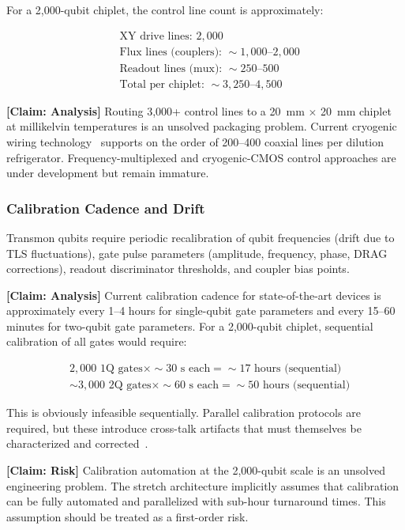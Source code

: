 \documentclass[conference]{IEEEtran}
\begin{document}
For a 2,000-qubit chiplet, the control line count is approximately:

\begin{align}
&\text{XY drive lines: } 2{,}000 \nonumber \\
&\text{Flux lines (couplers): } {\sim}1{,}000\text{--}2{,}000 \nonumber \\
&\text{Readout lines (mux): } {\sim}250\text{--}500 \nonumber \\
&\text{Total per chiplet: } {\sim}3{,}250\text{--}4{,}500 \nonumber
\end{align}

\textbf{[Claim: Analysis]} Routing 3,000+ control lines to a 20~mm $\times$ 20~mm chiplet at millikelvin temperatures is an unsolved packaging problem. Current cryogenic wiring technology~\cite{krinner2019} supports on the order of 200--400 coaxial lines per dilution refrigerator. Frequency-multiplexed and cryogenic-CMOS control approaches are under development but remain immature.

\subsubsection{Calibration Cadence and Drift}

Transmon qubits require periodic recalibration of qubit frequencies (drift due to TLS fluctuations), gate pulse parameters (amplitude, frequency, phase, DRAG corrections), readout discriminator thresholds, and coupler bias points.

\textbf{[Claim: Analysis]} Current calibration cadence for state-of-the-art devices is approximately every 1--4 hours for single-qubit gate parameters and every 15--60 minutes for two-qubit gate parameters. For a 2,000-qubit chiplet, sequential calibration of all gates would require:

\begin{align}
&2{,}000 \text{ 1Q gates} \times {\sim}30\text{~s each} = {\sim}17\text{~hours (sequential)} \nonumber \\
&{\sim}3{,}000 \text{ 2Q gates} \times {\sim}60\text{~s each} = {\sim}50\text{~hours (sequential)} \nonumber
\end{align}

This is obviously infeasible sequentially. Parallel calibration protocols are required, but these introduce cross-talk artifacts that must themselves be characterized and corrected~\cite{sheldon2016}.

\textbf{[Claim: Risk]} Calibration automation at the 2,000-qubit scale is an unsolved engineering problem. The stretch architecture implicitly assumes that calibration can be fully automated and parallelized with sub-hour turnaround times. This assumption should be treated as a first-order risk.
\end{document}
